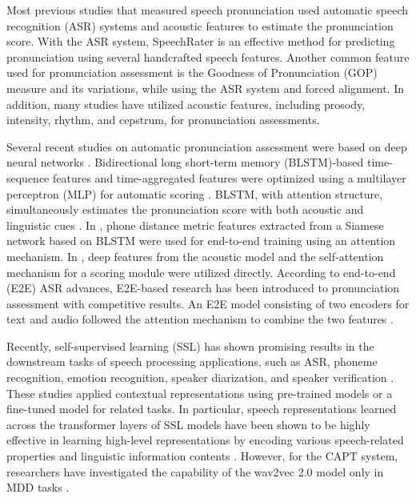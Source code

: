 \documentclass[a4paper]{article}
\begin{document}
Most previous studies that measured speech pronunciation used automatic speech recognition (ASR) systems and acoustic features to estimate the pronunciation score. With the ASR system, SpeechRater \cite{zechner2009automatic} is an effective method for predicting pronunciation using several handcrafted speech features. Another common feature used for pronunciation assessment is the Goodness of Pronunciation (GOP) measure \cite{witt2000phone,sudhakara2019improved} and its variations, while using the ASR system and forced alignment. In addition, many studies have utilized acoustic features, including prosody, intensity, rhythm, and cepstrum, for pronunciation assessments.

Several recent studies on automatic pronunciation assessment were based on deep neural networks \cite{lin2021attention,yu2015using, chen2018end,Kyriakopoulos2018,lin21j_interspeech}. Bidirectional long short-term memory (BLSTM)-based time-sequence features and time-aggregated features were optimized using a multilayer perceptron (MLP) for automatic scoring \cite{yu2015using}. BLSTM, with attention structure, simultaneously estimates the pronunciation score with both acoustic and linguistic cues \cite{chen2018end}. In \cite{Kyriakopoulos2018}, phone distance metric features extracted from a Siamese network based on BLSTM were used for end-to-end training using an attention mechanism. In \cite{lin21j_interspeech}, deep features from the acoustic model and the self-attention mechanism for a scoring module were utilized directly. According to end-to-end (E2E) ASR advances, E2E-based research has been introduced to pronunciation assessment with competitive results. An E2E model consisting of two encoders for text and audio followed the attention mechanism to combine the two features \cite{lin2021attention}.

Recently, self-supervised learning (SSL) \cite{liu2020mockingjay, liu2021tera, baevski2020wav2vec, hsu21_interspeech, hsu2021hubert} has shown promising results in the downstream tasks of speech processing applications, such as ASR, phoneme recognition, emotion recognition, speaker diarization, and speaker verification \cite{baevski2020wav2vec,hsu2021hubert,yang2021superb}. These studies applied contextual representations using pre-trained models or a fine-tuned model for related tasks. In particular, speech representations learned across the transformer layers of SSL models have been shown to be highly effective in learning high-level representations by encoding various speech-related properties and linguistic information contents \cite{ma2021probing,pasad2021layer,shah2021all}. However, for the CAPT system, researchers have investigated the capability of the wav2vec 2.0 model only in MDD tasks \cite{peng21e_interspeech, wu21h_interspeech,xu21k_interspeech}.
\end{document}
